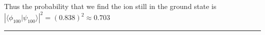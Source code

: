 \documentclass{article}
\newcommand{\inner}[2]{\langle #1 | #2 \rangle}
\begin{document}
Thus the probability that we find the ion still in the ground state is $\left|\inner{\phi_{100}}{\psi_{100}}\right|^2 = (0.838)^2 \approx 0.703$ 

\vskip 0.5cm 
\hrule 
\vskip 0.5cm







\end{document}
